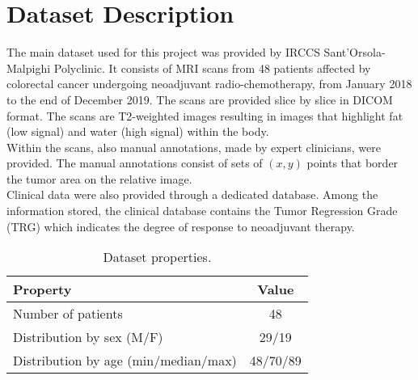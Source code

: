 \documentclass{standalone}
\begin{document}
\section{Dataset Description}
The main dataset used for this project was provided by IRCCS Sant’Orsola-Malpighi Polyclinic.
It consists of MRI scans from 48 patients affected by colorectal cancer undergoing neoadjuvant radio-chemotherapy, from January 2018 to the end of December 2019.
The scans are provided slice by slice in DICOM format.
The scans are T2-weighted images resulting in images that highlight fat (low signal) and water (high signal) within the body.
\\
Within the scans, also manual annotations, made by expert clinicians, were provided.
The manual annotations consist of sets of $(x, y)$ points that border the tumor area on the relative image.
\\
Clinical data were also provided through a dedicated database.
Among the information stored, the clinical database contains the Tumor Regression Grade (TRG) which indicates the degree of response to neoadjuvant therapy.

\begin{table}[ht]
	\centering
	\begin{tabular}{lc}
		\toprule
		\textbf{Property} & \textbf{Value}   \\
	    \midrule
		Number of patients &  48 \\
	    \midrule
		Distribution by sex (M/F) &  29/19 \\
		\midrule
		Distribution by age (min/median/max) &   48/70/89  \\
		\bottomrule
	\end{tabular}
	\caption{Dataset properties.}
	\label{tab:properties}
\end{table}
\end{document}
